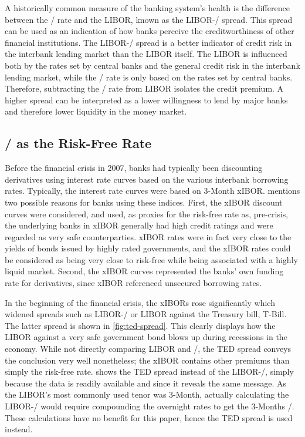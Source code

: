 \documentclass[main.tex]{subfiles}
\begin{document}
    A historically common measure of the banking system's health 
    is the difference between the \OIS/ rate and the LIBOR, known as the LIBOR-\OIS/ spread.
    This spread can be used as an indication of how banks perceive the creditworthiness
    of other financial institutions. 
    The LIBOR-\OIS/ spread is a better indicator of credit risk in the interbank lending market
    than the LIBOR itself. 
    The LIBOR is influenced both by the rates set by central banks and 
    the general credit risk in the interbank lending market,
    while the \OIS/ rate is only based on the rates set by central banks.
    Therefore, subtracting the \OIS/ rate from LIBOR isolates the credit premium.
    A higher spread can be interpreted as a lower willingness to lend by major banks
    and therefore lower liquidity in the money market.

    \subsection{\OIS/ as the Risk-Free Rate}
    
    Before the financial crisis in 2007, banks had typically been discounting
    derivatives using interest rate curves based on the various interbank borrowing rates.
    Typically, the interest rate curves were based on 3-Month xIBOR.
    \textcite[Section 8.6]{Green2015XVA} 
    mentions two possible reasons for banks using these indices.
    First, the xIBOR discount curves were considered, and used, as proxies for the risk-free rate
    as, pre-crisis, the underlying banks in xIBOR generally had high credit ratings
    and were regarded as very safe counterparties.
    xIBOR rates were in fact very close to the yields of bonds issued by highly rated governments,
    and the xIBOR rates could be considered as being very close to risk-free 
    while being associated with a highly liquid market.
    Second, the xIBOR curves represented the banks' own funding rate for derivatives, since
    xIBOR referenced unsecured borrowing rates.

    In the beginning of the financial crisis, the xIBORs rose significantly
    which widened spreads such as LIBOR-\OIS/ or LIBOR against the Treasury bill, T-Bill.
    The latter spread is shown in \cref{fig:ted-spread}. This clearly 
    displays how the LIBOR against a very safe government bond blows up
    during recessions in the economy. 
    While not directly comparing LIBOR and \OIS/, 
    the TED spread conveys the conclusion very well nonetheless;
    the xIBOR contains other premiums than simply the risk-free rate.
     shows the TED spread instead of the LIBOR-\OIS/,
    simply because the data is readily available and since it reveals the same message.
    As the LIBOR's most commonly used tenor was 3-Month, actually calculating the LIBOR-\OIS/
    would require compounding the overnight rates to get the 3-Months \OIS/.
    These calculations have no benefit for this paper, hence the TED spread is used instead.
\end{document}
